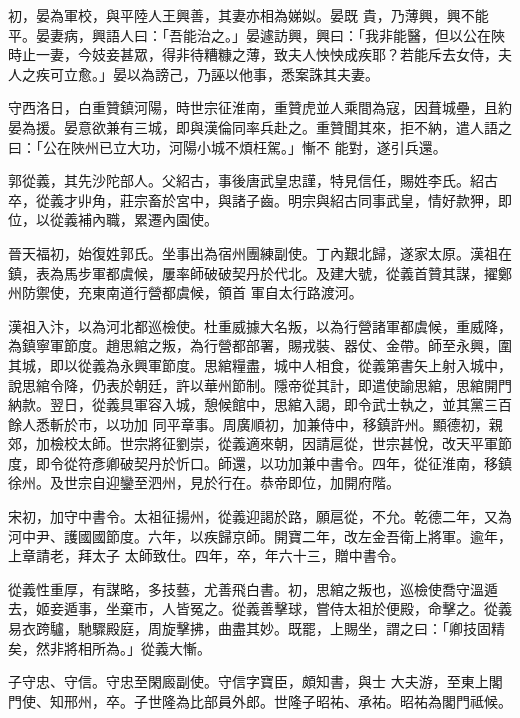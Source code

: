 \begin{pinyinscope}
 初，晏為軍校，與平陸人王興善，其妻亦相為娣姒。晏既
 貴，乃薄興，興不能平。晏妻病，興語人曰：「吾能治之。」晏遽訪興，興曰：「我非能醫，但以公在陜時止一妻，今妓妾甚眾，得非待糟糠之薄，致夫人怏怏成疾耶？若能斥去女侍，夫人之疾可立愈。」晏以為謗己，乃誣以他事，悉案誅其夫妻。



 守西洛日，白重贊鎮河陽，時世宗征淮南，重贊虎並人乘間為寇，因葺城壘，且約晏為援。晏意欲兼有三城，即與漢倫同率兵赴之。重贊聞其來，拒不納，遣人語之曰：「公在陜州已立大功，河陽小城不煩枉駕。」慚不
 能對，遂引兵還。



 郭從義，其先沙陀部人。父紹古，事後唐武皇忠謹，特見信任，賜姓李氏。紹古卒，從義才丱角，莊宗畜於宮中，與諸子齒。明宗與紹古同事武皇，情好款狎，即位，以從義補內職，累遷內園使。



 晉天福初，始復姓郭氏。坐事出為宿州團練副使。丁內艱北歸，遂家太原。漢祖在鎮，表為馬步軍都虞候，屢率師破破契丹於代北。及建大號，從義首贊其謀，擢鄭州防禦使，充東南道行營都虞候，領首
 軍自太行路渡河。



 漢祖入汴，以為河北都巡檢使。杜重威據大名叛，以為行營諸軍都虞候，重威降，為鎮寧軍節度。趙思綰之叛，為行營都部署，賜戎裝、器仗、金帶。師至永興，圍其城，即以從義為永興軍節度。思綰糧盡，城中人相食，從義第書矢上射入城中，說思綰令降，仍表於朝廷，許以華州節制。隱帝從其計，即遣使諭思綰，思綰開門納款。翌日，從義具軍容入城，憩候館中，思綰入謁，即令武士執之，並其黨三百餘人悉斬於市，以功加
 同平章事。周廣順初，加兼侍中，移鎮許州。顯德初，親郊，加檢校太師。世宗將征劉崇，從義適來朝，因請扈從，世宗甚悅，改天平軍節度，即令從符彥卿破契丹於忻口。師還，以功加兼中書令。四年，從征淮南，移鎮徐州。及世宗自迎鑾至泗州，見於行在。恭帝即位，加開府階。



 宋初，加守中書令。太祖征揚州，從義迎謁於路，願扈從，不允。乾德二年，又為河中尹、護國國節度。六年，以疾歸京師。開寶二年，改左金吾衛上將軍。逾年，上章請老，拜太子
 太師致仕。四年，卒，年六十三，贈中書令。



 從義性重厚，有謀略，多技藝，尤善飛白書。初，思綰之叛也，巡檢使喬守溫遁去，姬妾遁事，坐棄市，人皆冤之。從義善擊球，嘗侍太祖於便殿，命擊之。從義易衣跨驢，馳驟殿庭，周旋擊拂，曲盡其妙。既罷，上賜坐，謂之曰：「卿技固精矣，然非將相所為。」從義大慚。



 子守忠、守信。守忠至閑廄副使。守信字寶臣，頗知書，與士
 大夫游，至東上閣門使、知邢州，卒。子世隆為比部員外郎。世隆子昭祐、承祐。昭祐為閣門祗候。




\end{pinyinscope}
